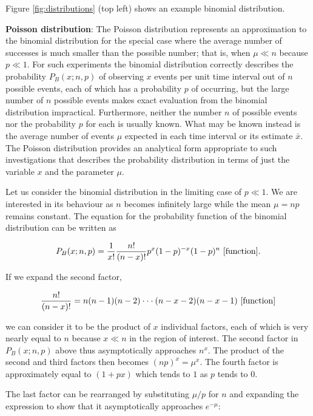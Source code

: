 \documentclass[a4paper,10pt]{article}
\begin{document}
{\noindent}Figure \ref{fig:distributions} (top left) shows an example binomial distribution.

{\noindent}\textbf{Poisson distribution}: The Poisson distribution represents an approximation to the binomial distribution for the special case where the average number of successes is much smaller than the possible number; that is, when $\mu\ll n$ because $p\ll1$. For such experiments the binomial distribution correctly describes the probability $P_B(x;n,p)$ of observing $x$ events per unit time interval out of $n$ possible events, each of which has a probability $p$ of occurring, but the large number of $n$ possible events makes exact evaluation from the binomial distribution impractical. Furthermore, neither the number $n$ of possible events nor the probability $p$ for each is usually known. What may be known instead is the average number of events $\mu$ expected in each time interval or its estimate $\bar{x}$. The Poisson distribution provides an analytical form appropriate to such investigations that describes the probability distribution in terms of just the variable $x$ and the parameter $\mu$. 

{\noindent}Let us consider the binomial distribution in the limiting case of $p\ll1$. We are interested in its behaviour as $n$ becomes infinitely large while the mean $\mu=np$ remains constant. The equation for the probability function of the binomial distribution can be written as

\begin{align*}
    P_B(x;n,p) = \frac{1}{x!} \frac{n!}{(n-x)!} p^x(1-p)^{-x}(1-p)^n ~ [{\rm function}].
\end{align*}

{\noindent}If we expand the second factor,

\begin{align*}
    \frac{n!}{(n-x)!} = n(n-1)(n-2) \cdot\cdot\cdot (n-x-2)(n-x-1) ~ [{\rm function}]
\end{align*}

{\noindent}we can consider it to be the product of $x$ individual factors, each of which is very nearly equal to $n$ because $x\ll n$ in the region of interest. The second factor in $P_B(x;n,p)$ above thus asymptotically approaches $n^x$. The product of the second and third factors then becomes $(np)^x=\mu^x$. The fourth factor is approximately equal to $(1+px)$ which tends to $1$ as $p$ tends to $0$.

{\noindent}The last factor can be rearranged by substituting $\mu/p$ for $n$ and expanding the expression to show that it asymptotically approaches $e^{-\mu}$:
\end{document}
